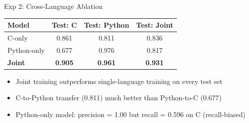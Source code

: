 \documentclass[aspectratio=169]{beamer}
\newcommand{\good}[1]{\textcolor{green!60!black}{#1}}
\newcommand{\bad}[1]{\textcolor{red!70!black}{#1}}
\begin{document}
\begin{frame}{Exp 2: Cross-Language Ablation}
  \begin{center}
    \begin{tabular}{lccc}
      \toprule
      \textbf{Model} & \textbf{Test: C} & \textbf{Test: Python} & \textbf{Test: Joint} \\
      \midrule
      C-only     & 0.861 & 0.811 & 0.836 \\
      Python-only & 0.677 & 0.976 & 0.817 \\
      \textbf{Joint} & \textbf{0.905} & \textbf{0.961} & \textbf{0.931} \\
      \bottomrule
    \end{tabular}
  \end{center}
  \vspace{0.5em}
  \begin{itemize}
    \item Joint training \good{outperforms} single-language training on every test set
    \item C-to-Python transfer (0.811) \good{much better} than Python-to-C (0.677)
    \item Python-only model: precision = 1.00 but recall = 0.596 on C \bad{(recall-biased)}
  \end{itemize}
\end{frame}
\end{document}
